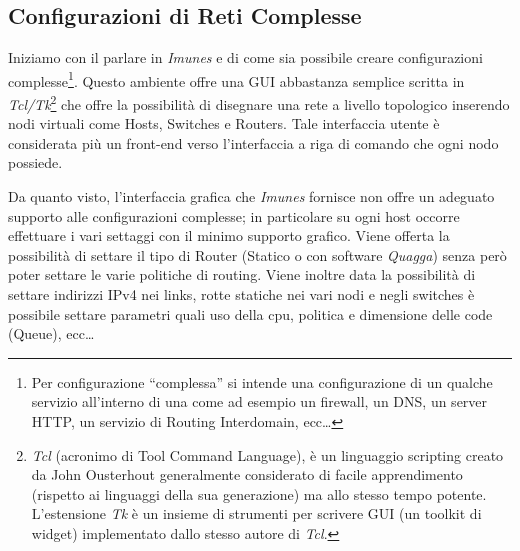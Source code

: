 \subsection{Configurazioni di Reti Complesse}\label{subsection:ccrc}
Iniziamo con il parlare in \emph{Imunes} e di come sia possibile creare configurazioni complesse\footnote{Per configurazione ``complessa'' si intende una configurazione di un qualche servizio all'interno di una \virtualmachine{} come ad esempio un firewall, un DNS, un server HTTP, un servizio di Routing Interdomain, ecc\ldots}.
Questo ambiente offre una GUI abbastanza semplice scritta in \emph{Tcl/Tk}\footnote{\emph{Tcl} (acronimo di Tool Command Language), è un linguaggio scripting creato da John Ousterhout generalmente considerato di facile apprendimento (rispetto ai linguaggi della sua generazione) ma allo stesso tempo potente. L'estensione \emph{Tk} è un insieme di strumenti per scrivere GUI (un toolkit di widget) implementato dallo stesso autore di \emph{Tcl}.} che offre la possibilità di disegnare una rete a livello topologico inserendo nodi virtuali come Hosts, Switches e Routers. Tale interfaccia utente è considerata più un front-end verso l'interfaccia a riga di comando che ogni nodo possiede.

Da quanto visto\cite{IMUNESHOWTO}, l'interfaccia grafica che \emph{Imunes} fornisce non offre un adeguato supporto alle configurazioni complesse; in particolare su ogni host occorre effettuare i vari settaggi con il minimo supporto grafico. Viene offerta la possibilità di settare il tipo di Router (Statico o con software \emph{Quagga}) senza però poter settare le varie politiche di routing. Viene inoltre data la possibilità di settare indirizzi IPv4 nei links, rotte statiche nei vari nodi e negli switches è possibile settare parametri quali uso della cpu, politica e dimensione delle code (Queue), ecc\ldots

